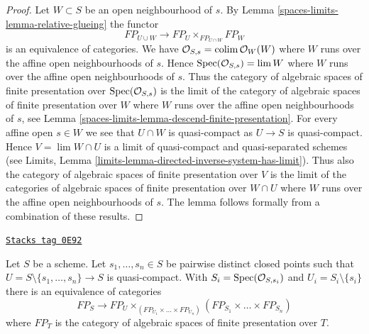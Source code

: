 \begin{proof}
Let $W \subset S$ be an open neighbourhood of $s$. By
Lemma \ref{spaces-limits-lemma-relative-glueing} the functor
$$
FP_{U \cup W}
\longrightarrow
FP_U \times_{FP_{U \cap W}} FP_W
$$
is an equivalence of categories. We have
$\mathcal{O}_{S, s} = \operatorname{colim} \mathcal{O}_W(W)$ where
$W$ runs over the affine open neighbourhoods of $s$.
Hence $\operatorname{Spec}(\mathcal{O}_{S, s}) = \lim W$ where $W$
runs over the affine open neighbourhoods of $s$.
Thus the category of algebraic spaces of finite presentation
over $\operatorname{Spec}(\mathcal{O}_{S, s})$ is the limit of the
category of algebraic spaces of finite presentation over
$W$ where $W$ runs over the affine open neighbourhoods
of $s$, see
Lemma \ref{spaces-limits-lemma-descend-finite-presentation}.
For every affine open $s \in W$ we see that $U \cap W$
is quasi-compact as $U \to S$ is quasi-compact.
Hence $V = \lim W \cap U$ is a limit of
quasi-compact and quasi-separated schemes (see
Limits, Lemma \ref{limits-lemma-directed-inverse-system-has-limit}).
Thus also the category of algebraic spaces of finite presentation
over $V$ is the limit of the
categories of algebraic spaces of finite presentation over
$W \cap U$ where $W$ runs over the affine open neighbourhoods
of $s$. The lemma follows formally from a combination
of these results.
\end{proof}

\begin{lemma}
\label{spaces-limits-lemma-glueing-near-multiple-closed-points}
\href{https://stacks.math.columbia.edu/tag/0E92}{\texttt{Stacks tag 0E92}}

Let $S$ be a scheme. Let $s_1, \ldots, s_n \in S$ be
pairwise distinct closed points such that
$U = S \setminus \{s_1, \ldots, s_n\} \to S$ is quasi-compact. With
$S_i = \operatorname{Spec}(\mathcal{O}_{S, s_i})$ and $U_i = S_i \setminus \{s_i\}$
there is an equivalence of categories
$$
FP_S \longrightarrow
FP_U \times_{(FP_{U_1} \times \ldots \times FP_{U_n})}
(FP_{S_1} \times \ldots \times FP_{S_n})
$$
where $FP_T$ is the category of algebraic spaces of finite presentation
over $T$.
\end{lemma}


